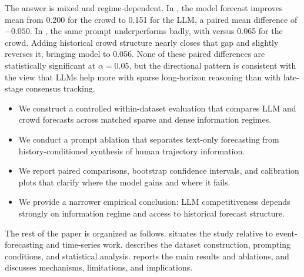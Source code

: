  The answer is mixed and regime-dependent. In \longterm, the \questiononly model forecast improves mean \brier from 0.200 for the crowd to 0.151 for the LLM, a paired mean difference of $-0.050$. In \shortterm, the same prompt underperforms badly, with  versus 0.065 for the crowd. Adding historical crowd structure nearly closes that gap and slightly reverses it, bringing model \brier to 0.056. None of these paired differences are statistically significant at $\alpha=0.05$, but the directional pattern is consistent with the view that LLMs help more with sparse long-horizon reasoning than with late-stage consensus tracking.

\begin{itemize}
\setlength{\itemsep}{0pt}
\setlength{\topsep}{0pt}
\item We construct a controlled within-dataset evaluation that compares LLM and crowd forecasts across matched sparse and dense information regimes.
\item We conduct a prompt ablation that separates text-only forecasting from history-conditioned synthesis of human trajectory information.
\item We report paired \brier comparisons, bootstrap confidence intervals, and calibration plots that clarify where the model gains and where it fails.
\item We provide a narrower empirical conclusion: LLM competitiveness depends strongly on information regime and access to historical forecast structure.
\end{itemize}

The rest of the paper is organized as follows.  situates the study relative to event-forecasting and time-series work.  describes the dataset construction, prompting conditions, and statistical analysis.  reports the main results and ablations, and  discusses mechanisms, limitations, and implications.
